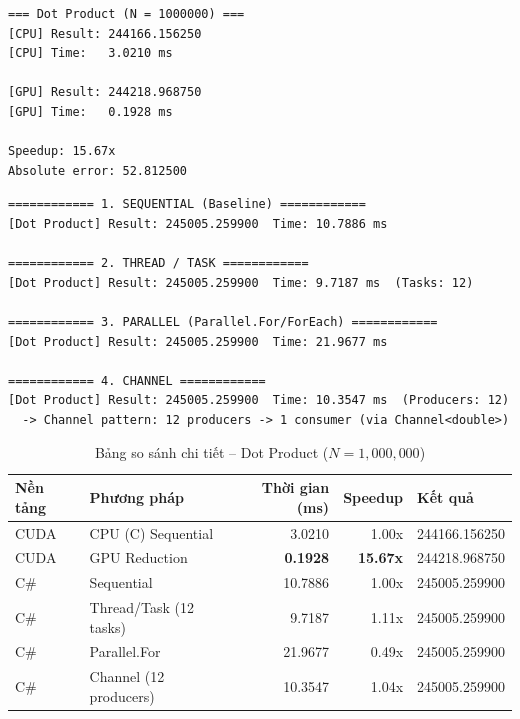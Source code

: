\documentclass[12pt,a4paper]{article}
\begin{document}
\begin{outputbox}
\begin{verbatim}
=== Dot Product (N = 1000000) ===
[CPU] Result: 244166.156250
[CPU] Time:   3.0210 ms

[GPU] Result: 244218.968750
[GPU] Time:   0.1928 ms

Speedup: 15.67x
Absolute error: 52.812500
\end{verbatim}
\end{outputbox}

\begin{outputbox}
\begin{verbatim}
============ 1. SEQUENTIAL (Baseline) ============
[Dot Product] Result: 245005.259900  Time: 10.7886 ms

============ 2. THREAD / TASK ============
[Dot Product] Result: 245005.259900  Time: 9.7187 ms  (Tasks: 12)

============ 3. PARALLEL (Parallel.For/ForEach) ============
[Dot Product] Result: 245005.259900  Time: 21.9677 ms

============ 4. CHANNEL ============
[Dot Product] Result: 245005.259900  Time: 10.3547 ms  (Producers: 12)
  -> Channel pattern: 12 producers -> 1 consumer (via Channel<double>)
\end{verbatim}
\end{outputbox}

\begin{table}[H]
\centering
\caption{Bảng so sánh chi tiết -- Dot Product ($N = 1{,}000{,}000$)}
\label{tab:dot_compare}
\begin{tabular}{llrrl}
\toprule
\textbf{Nền tảng} & \textbf{Phương pháp} & \textbf{Thời gian (ms)} & \textbf{Speedup} & \textbf{Kết quả} \\
\midrule
CUDA & CPU (C) Sequential     & 3.0210  & 1.00x  & 244166.156250 \\
CUDA & GPU Reduction          & \textbf{0.1928}  & \textbf{15.67x} & 244218.968750 \\
\midrule
C\#  & Sequential             & 10.7886 & 1.00x  & 245005.259900 \\
C\#  & Thread/Task (12 tasks) & 9.7187  & 1.11x  & 245005.259900 \\
C\#  & Parallel.For           & 21.9677 & 0.49x  & 245005.259900 \\
C\#  & Channel (12 producers) & 10.3547 & 1.04x  & 245005.259900 \\
\bottomrule
\end{tabular}
\end{table}
\end{document}
